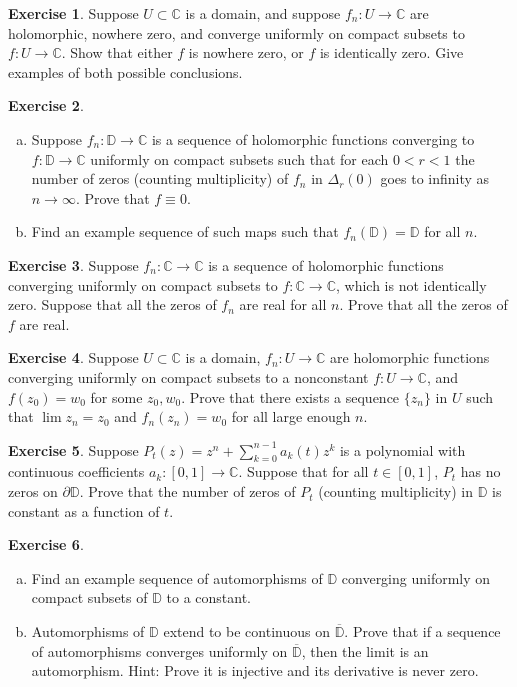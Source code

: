 \documentclass[12pt,openany]{book}
\newcommand{\C}{{\mathbb{C}}}
\newcommand{\D}{{\mathbb{D}}}
\theoremstyle{plain}
\theoremstyle{remark}
\theoremstyle{definition}
\newenvironment{exbox}{%
    \def\FrameCommand{\vrule width 1pt \relax\hspace{10pt}}%
    \MakeFramed{\advance\hsize-\width\FrameRestore}%
}{%
    \endMakeFramed
}
\newenvironment{exparts}{%
    \leavevmode\begin{enumerate}[a),noitemsep,topsep=0pt,parsep=0pt,partopsep=0pt]
}{%
    \end{enumerate}
}
\theoremstyle{exercise}
\newtheorem{exercise}{Exercise}[section]
\theoremstyle{example}
\begin{document}
\begin{exbox}
\begin{exercise}
Suppose $U \subset \C$ is a domain,
and suppose
$f_n \colon U \to \C$ are holomorphic, nowhere zero,
and converge uniformly on compact subsets to $f \colon U \to \C$.
Show that either $f$ is nowhere zero, or $f$ is identically zero.
Give examples of both possible conclusions.
\end{exercise}

\begin{exercise}
\begin{exparts}
\item
Suppose $f_n \colon \D \to \C$ is a sequence of holomorphic functions converging
to $f \colon \D \to \C$ uniformly on compact subsets such that
for each $0 < r < 1$ the number of zeros (counting multiplicity)
of $f_n$ in $\Delta_r(0)$ goes to infinity as $n \to \infty$.
Prove that $f \equiv 0$.
\item
Find an example sequence of such maps such that $f_n(\D) = \D$
for all $n$.
\end{exparts}
\end{exercise}

\begin{exercise}
Suppose 
$f_n \colon \C \to \C$ is a sequence of holomorphic
functions
converging uniformly on compact subsets to $f \colon \C \to \C$,
which is not identically zero.
Suppose that all the zeros of $f_n$ are real for all $n$.
Prove that all the zeros of $f$ are real.
\end{exercise}

\begin{exercise}
Suppose $U \subset \C$ is a domain,
$f_n \colon U \to \C$ are holomorphic functions
converging uniformly on compact subsets to a nonconstant $f \colon U \to \C$,
and $f(z_0) = w_0$ for some $z_0, w_0$.  
Prove that there exists a sequence $\{ z_n \}$ in $U$ such that
$\lim z_n = z_0$ and $f_n(z_n) = w_0$ for all large enough $n$.
\end{exercise}

\begin{exercise}
Suppose $P_t(z) = z^n + \sum_{k=0}^{n-1} a_k(t) z^k$ is a polynomial
with continuous coefficients $a_k \colon [0,1] \to \C$.  Suppose that
for all $t \in [0,1]$, $P_t$ has
no zeros on $\partial \D$.
Prove that the number of zeros
of $P_t$ (counting multiplicity) in $\D$ is constant as a function of $t$.
\end{exercise}

\begin{exercise}
\begin{exparts}
\item
Find an example sequence of automorphisms of $\D$ converging
uniformly on compact subsets of $\D$ to a constant.
\item
Automorphisms of $\D$ extend to be continuous on
$\overline{\D}$.  Prove that if a sequence
of automorphisms converges uniformly on $\overline{\D}$, then
the limit is an automorphism. Hint: Prove it is injective
and its derivative is never zero.
\end{exparts}
\end{exercise}


\end{exbox}
\end{document}
